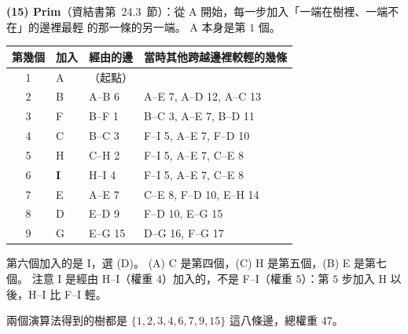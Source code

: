 \begin{pastsoln}
\textbf{(15) Prim}（資結書第~24.3~節）：從 A 開始，每一步加入「一端在樹裡、一端不在」的邊裡最輕
的那一條的另一端。 A 本身是第 $1$ 個。
\begin{center}
\small
\begin{tabular}{clll}
\toprule
第幾個 & 加入 & 經由的邊 & 當時其他跨越邊裡較輕的幾條 \\
\midrule
1 & A & （起點） & \\
2 & B & A--B 6 & A--E 7, A--D 12, A--C 13 \\
3 & F & B--F 1 & B--C 3, A--E 7, B--D 11 \\
4 & C & B--C 3 & F--I 5, A--E 7, F--D 10 \\
5 & H & C--H 2 & F--I 5, A--E 7, C--E 8 \\
6 & \textbf{I} & H--I 4 & F--I 5, A--E 7, C--E 8 \\
7 & E & A--E 7 & C--E 8, F--D 10, E--H 14 \\
8 & D & E--D 9 & F--D 10, E--G 15 \\
9 & G & E--G 15 & D--G 16, F--G 17 \\
\bottomrule
\end{tabular}
\end{center}
第六個加入的是 I，選 (D)。 (A) C 是第四個，(C) H 是第五個，(B) E 是第七個。 注意 I 是經由
H--I（權重 $4$）加入的，不是 F--I（權重 $5$）：第 $5$ 步加入 H 以後，H--I 比 F--I 輕。

兩個演算法得到的樹都是 $\{1, 2, 3, 4, 6, 7, 9, 15\}$ 這八條邊，總權重 $47$。
\end{pastsoln}
